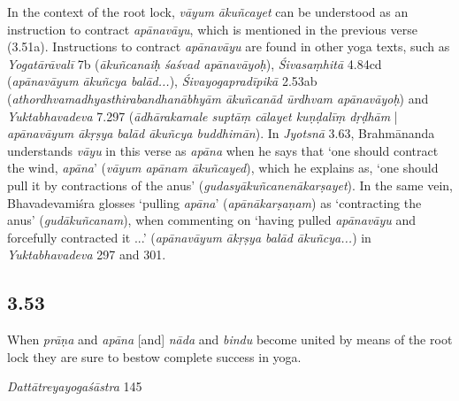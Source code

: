 \begin{ekdosis}
\begin{philcomm}[hp03_052]
In the context of the root lock, \emph{vāyum ākuñcayet} can be understood as an instruction to contract \emph{apāna\-vāyu}, which is mentioned in the previous verse (3.51a). Instructions to contract \emph{apāna\-vāyu} are found in other yoga texts, such as \emph{Yoga\-tārā\-valī} 7b (\emph{ākuñcanaiḥ śaśvad apānavāyoḥ}), \emph{Śiva\-saṃhitā} 4.84cd (\emph{apāna\-vāyum ākuñcya balād...}), \emph{Śiva\-yoga\-pradīpikā} 2.53ab (\emph{athordhva\-madhya\-sthira\-bandha\-nābhyām ākuñcanād ūrdhvam apānavāyoḥ}) and \emph{Yukta\-bhava\-deva} 7.297 (\emph{ādhāra\-kamale suptāṃ cālayet kuṇḍalīṃ dṛḍhām} | \emph{apāna\-vāyum ākṛṣya balād ākuñcya buddhimān}). In \emph{Jyotsnā} 3.63, Brahmānanda understands \emph{vāyu} in this verse as \emph{apāna} when he says that `one should contract the wind, \emph{apāna}' (\emph{vāyum apānam ākuñcayed}), which he explains as, `one should pull it by contractions of the anus' (\emph{gudasyā\-kuñcanenā\-karṣayet}). In the same vein, Bhava\-deva\-miśra glosses `pulling \emph{apāna}' (\emph{apānā\-karṣaṇam}) as `contracting the anus' (\emph{gudā\-kuñcanam}), when commenting on `having pulled \emph{apāna\-vāyu} and forcefully contracted it ...' (\emph{apāna\-vāyum ākṛṣya balād ākuñcya...}) in \emph{Yukta\-bhava\-deva} 297 and 301.  
\end{philcomm} %

\subsection*{3.53}
\begin{translation}[hp03_053]
When \emph{prāṇa} and \emph{apāna} [and] \emph{nāda} and \emph{bindu} become united by means of the root lock they are sure to bestow complete success in yoga.
\end{translation}

\begin{sources}[hp03_053]
\emph{Dattātreyayogaśāstra} 145
\begin{versinnote}
\tl{\var{145c gatvā yogasya saṃ° ] gacchato yogasaṃ° M1A}\\+}
\tl{\var{145d yacchato ] gacchato M1, kurute AM2, gachate \pi}\\!}
\end{versinnote}


\end{sources}
\end{ekdosis}
